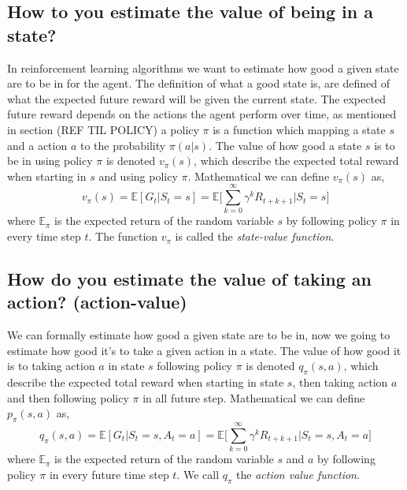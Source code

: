 \documentclass[11pt]{article}
\begin{document}
\subsection{How to you estimate the value of being in a state?}

In reinforcement learning algorithms we want to estimate how good a given state are to be in for the agent. The definition of what a good state is, are defined of what the expected future reward will be given the current state. The expected future reward depends on the actions the agent perform over time, as mentioned in section (REF TIL POLICY) a policy $\pi$ is a function which mapping a state $s$ and a action $a$ to the probability $\pi(a|s)$.
The value of how good a state $s$ is to be in using policy $\pi$ is denoted $v_{\pi}(s)$, which describe the expected total reward when starting in $s$ and using policy $\pi$. Mathematical we can define $v_{\pi}(s)$ as,
\begin{equation}
    v_{\pi}(s) = \mathds{E}[G_{t} | S_{t} = s] = \mathds{E}\bigg[\sum_{k = 0}^{\infty} \gamma^{k} R_{t + k + 1} \bigg| S_{t} = s \bigg]
\end{equation}
where $\mathds{E}_{\pi}$ is the expected return of the random variable $s$ by following policy $\pi$ in every time step $t$. The function $v_{\pi}$ is called the \textit{state-value function}.

\subsection{How do you estimate the value of taking an action? (action-value)}

We can formally estimate how good a given state are to be in, now we going to estimate how good it's to take a given action in a state. The value of how good it is to taking action $a$ in state $s$ following policy $\pi$ is denoted $q_{\pi}(s, a)$, which describe the expected total reward when starting in state $s$, then taking action $a$ and then following policy $\pi$ in all future step. Mathematical we can define $p_{\pi}(s, a)$ as,
\begin{equation}
    q_{\pi}(s, a) = \mathds{E}[G_{t} | S_{t} = s, A_{t} = a] = \mathds{E}\bigg[\sum_{k = 0}^{\infty} \gamma^{k} R_{t + k + 1} \bigg| S_{t} = s, A_{t} = a \bigg]
\end{equation}
where $\mathds{E}_{\pi}$ is the expected return of the random variable $s$ and $a$ by following policy $\pi$ in every future time step $t$. We call $q_{\pi}$ the \textit{action value function}.
\end{document}
